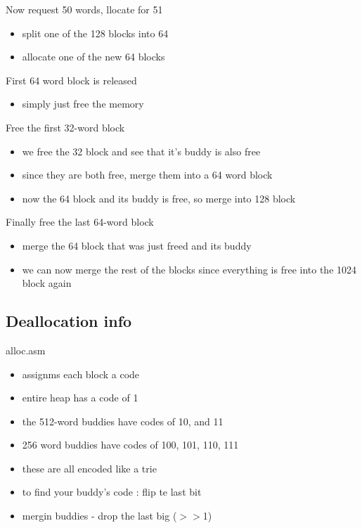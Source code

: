 \documentclass[12pt]{article}
\begin{document}
	Now request 50 words, llocate for 51\\
	\begin{itemize}
		\item split one of the 128 blocks into 64
		\item allocate one of the new 64 blocks
	\end{itemize}
	
	First 64 word block is released\\
	\begin{itemize}
		\item simply just free the memory
	\end{itemize}
	
	Free the first 32-word block\\
	\begin{itemize}
		\item we free the 32 block and see that it's buddy is also free
		\item since they are both free, merge them into a 64 word block
		\item now the 64 block and its buddy is free, so merge into 128 block
	\end{itemize}
	
	Finally free the last 64-word block
	\begin{itemize}
		\item merge the 64 block that was just freed and its buddy
		\item we can now merge the rest of the blocks since everything is free into the 1024 block again
	\end{itemize}
	
	\subsection*{Deallocation info}
	alloc.asm
	\begin{itemize}
		\item assignms each block a code
		\item entire heap has a code of 1
		\item the 512-word buddies have codes of 10, and 11
		\item 256 word buddies have codes of 100, 101, 110, 111
		\item these are all encoded like a trie
		\item to find your buddy's code : flip te last bit
		\item mergin buddies - drop the last big ($>>$1)
	\end{itemize}
	
\end{document}

